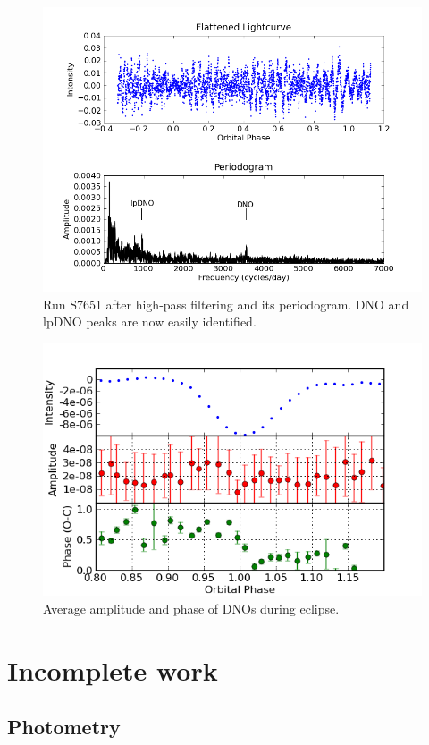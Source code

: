 \documentclass[a4paper,10pt]{article}
\begin{document}
\begin{figure}
 \centering
 \includegraphics[bb=0 0 600 400,width=0.8\columnwidth]{../images/flattened.png}
 \caption{Run S7651 after high-pass filtering and its periodogram. DNO and lpDNO peaks are now easily identified.}
 \label{flat}
\end{figure}


\begin{figure}
 \centering
 \includegraphics[width=0.8\columnwidth,bb=0 0 600 400]{../images/average_OC.png}
 \caption{Average amplitude and phase of DNOs during eclipse.}
 \label{average_OC}
\end{figure}



\section{Incomplete work}

\subsection{Photometry}
\end{document}
